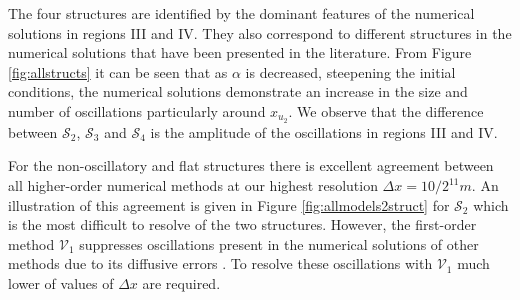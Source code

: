 \documentclass[times]{elsarticle}
\begin{document}
The four structures are identified by the dominant features of the numerical solutions in regions III and IV. They also correspond to different structures in the numerical solutions that have been presented in the literature. From Figure \ref{fig:allstructs} it can be seen that as $\alpha$ is decreased, steepening the initial conditions, the numerical solutions demonstrate an increase in the size and number of oscillations particularly around $x_{u_2}$. We observe that the difference between $\mathcal{S}_2$, $\mathcal{S}_3$ and $\mathcal{S}_4$ is the amplitude of the oscillations in regions III and IV.

For the non-oscillatory and flat structures there is excellent agreement between all higher-order numerical methods at our highest resolution $\Delta x = 10/2^{11}m$. An illustration of this agreement is given in Figure \ref{fig:allmodels2struct} for $\mathcal{S}_2$ which is the most difficult to resolve of the two structures. However, the first-order method $\mathcal{V}_1$ suppresses oscillations present in the numerical solutions of other methods due to its diffusive errors \cite{Zoppou-etal-2017}. To resolve these oscillations with $\mathcal{V}_1$ much lower of values of $\Delta x$ are required.
\end{document}
